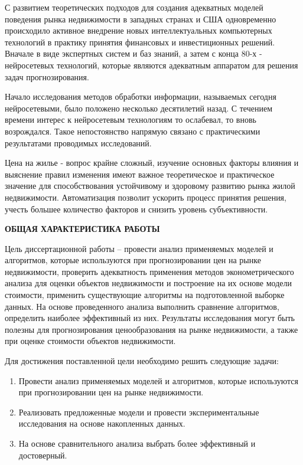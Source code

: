 С развитием теоретических подходов для создания адекватных моделей поведения рынка недвижимости в западных странах и
США одновременно происходило активное внедрение новых интеллектуальных компьютерных технологий в практику принятия
финансовых и инвестиционных решений. Вначале в виде экспертных систем и баз знаний, а затем с конца 80-х - нейросетевых
технологий, которые являются адекватным аппаратом для решения задач прогнозирования.

Начало исследования методов обработки информации, называемых сегодня нейросетевыми, было положено несколько десятилетий
назад. С течением времени интерес к нейросетевым технологиям то ослабевал, то вновь возрождался. Такое непостоянство
напрямую связано с практическими результатами проводимых исследований.

Цена на жилье - вопрос крайне сложный, изучение основных факторы влияния и выяснение правил изменения имеют важное теоретическое и
практическое значение для способствования устойчивому и здоровому развитию рынка жилой недвижимости.
Автоматизация позволит ускорить процесс принятия решения, учесть
большее количество факторов и снизить уровень субъективности.

\begin{center}
  \textbf{ОБЩАЯ ХАРАКТЕРИСТИКА РАБОТЫ}\\
\end{center}

Цель диссертационной работы – провести анализ применяемых моделей и алгоритмов, которые используются при
прогнозировании цен на рынке недвижимости, проверить адекватность применения методов эконометрического
анализа для оценки объектов недвижимости и построение на их основе модели стоимости, применить существующие алгоритмы на
подготовленной выборке данных.
На основе проведенного анализа выполнить сравнение алгоритмов, определить наиболее эффективный из них.
Результаты исследования могут быть полезны для прогнозирования
ценообразования на рынке недвижимости, а также при оценке стоимости объектов недвижимости.

Для достижения поставленной цели необходимо решить следующие задачи:
\begin{enumerate}
  \item Провести анализ применяемых моделей и алгоритмов, которые используются при прогнозировании цен на рынке недвижимости.
  \item Реализовать предложенные модели и провести экспериментальные исследования на основе накопленных данных.
  \item На основе сравнительного анализа выбрать более эффективный и достоверный.
\end{enumerate}

